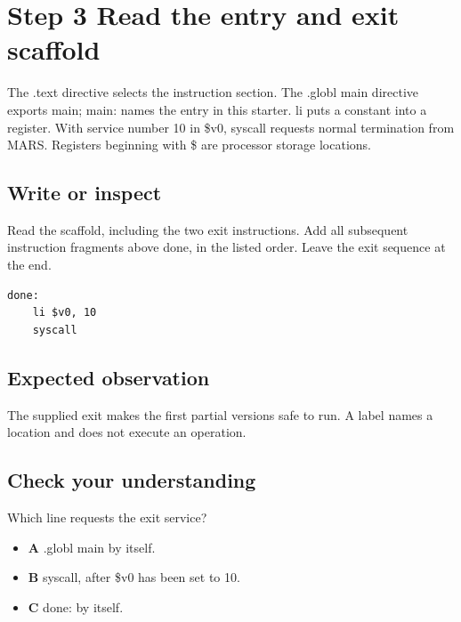 \section{Step 3 Read the entry and exit
  scaffold}\label{001-console-calculation-s03-step-3-read-the-entry-and-exit-scaffold}

The .text directive selects the instruction section. The .globl main
directive exports main; main: names the entry in this starter. li puts a
constant into a register. With service number 10 in \$v0, syscall
requests normal termination from MARS. Registers beginning with \$ are
processor storage locations.

\subsection{Write or
  inspect}\label{001-console-calculation-s03-write-or-inspect}

Read the scaffold, including the two exit instructions. Add all
subsequent instruction fragments above done, in the listed order. Leave
the exit sequence at the end.

\begin{verbatim}
done:
    li $v0, 10
    syscall
\end{verbatim}

\subsection{Expected
  observation}\label{001-console-calculation-s03-expected-observation}

The supplied exit makes the first partial versions safe to run. A label
names a location and does not execute an operation.

\subsection{Check your
  understanding}\label{001-console-calculation-s03-check-your-understanding}

Which line requests the exit service?

\begin{itemize}
  \tightlist
  \item
        \textbf{A} .globl main by itself.
  \item
        \textbf{B} syscall, after \$v0 has been set to 10.
  \item
        \textbf{C} done: by itself.
\end{itemize}
